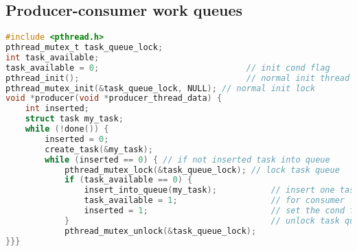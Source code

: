 \subsection*{Producer-consumer work queues}
\begin{lstlisting}[language=C,framexbottommargin=2pt]
#include <pthread.h>
pthread_mutex_t task_queue_lock;
int task_available;
task_available = 0;                              // init cond flag
pthread_init();                                  // normal init thread
pthread_mutex_init(&task_queue_lock, NULL); // normal init lock
void *producer(void *producer_thread_data) {
    int inserted;
    struct task my_task;
    while (!done()) {
        inserted = 0;
        create_task(&my_task);
        while (inserted == 0) { // if not inserted task into queue
            pthread_mutex_lock(&task_queue_lock); // lock task queue
            if (task_available == 0) {
                insert_into_queue(my_task);           // insert one task
                task_available = 1;                   // for consumer
                inserted = 1;                         // set the cond flag
            }                                         // unlock task queue
            pthread_mutex_unlock(&task_queue_lock);
}}}
\end{lstlisting}
